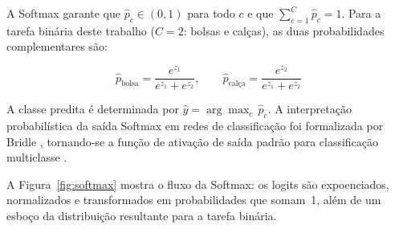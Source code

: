\documentclass[12pt,a4paper]{article}
\begin{document}
A Softmax garante que $\hat{p}_c \in (0,1)$ para todo $c$ e que
$\sum_{c=1}^{C}\hat{p}_c = 1$. Para a tarefa binária deste trabalho
($C = 2$: bolsas e calças), as duas probabilidades complementares são:

\begin{equation}
  \hat{p}_{\text{bolsa}} = \frac{e^{z_1}}{e^{z_1}+e^{z_2}},
  \qquad
  \hat{p}_{\text{calça}} = \frac{e^{z_2}}{e^{z_1}+e^{z_2}}
  \label{eq:softmax_bin}
\end{equation}

A classe predita é determinada por $\hat{y} = \arg\max_{c}\,\hat{p}_c$.
A interpretação probabilística da saída Softmax em redes de classificação
foi formalizada por Bridle \cite{bridle1990probabilistic}, tornando-se a
função de ativação de saída padrão para classificação multiclasse
\cite{goodfellow2016deep}.

A Figura~\ref{fig:softmax} mostra o fluxo da Softmax: os logits são
expoenciados, normalizados e transformados em probabilidades que somam~1,
além de um esboço da distribuição resultante para a tarefa binária.
\end{document}
